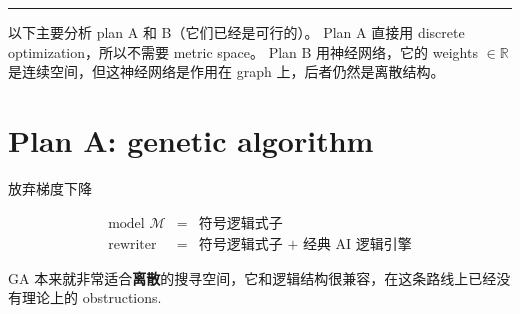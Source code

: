 \documentclass[12pt, orivec]{article}
\newcommand{\cc}[2]{#1}
\newcommand{\cc}[2]{#2}
\begin{document}


\begin{center}
\rule{0.4\textwidth}{.6pt}
\end{center}

\cc{以下主要分析 plan A 和 B（它们已经是可行的）。 Plan A 直接用 discrete optimization，所以不需要 metric space。  Plan B 用神经网络，它的 weights $\in \mathbb{R}$ 是连续空间，但这神经网络是作用在 graph 上，后者仍然是离散结构。
}{
The following main analysis of plan A and B (they are already feasible). Plan A uses discrete optimization directly, so no metric space is required. Plan B uses a neural network whose weights $\in \mathbb{R}$ is a contiguous space, but this neural network acts on the graph, which is still a discrete structure.}

\section{Plan A: genetic algorithm}
\label{COCO}

\begin{tcolorbox}[ams equation, colback=yellow, colframe=white]
\cc{
\mbox{放弃梯度下降}}{
\mbox{\textbf{abandon} gradient descent}
}
\end{tcolorbox}
\begin{eqnarray}
\cc{
\mbox{model } \mathscr{M} &=& \mbox{符号逻辑式子} \nonumber \\
}{
\mbox{model } \mathscr{M} &=& \mbox{symbolic logic formula} \nonumber \\
}
\cc{
\mbox{rewriter} &=& \mbox{符号逻辑式子 + 经典 AI 逻辑引擎}}{
\mbox{rewriter} &=& \mbox{symbolic logic formula + classical AI logic engine}
}
\end{eqnarray}

\cc{GA 本来就非常适合\textbf{离散}的搜寻空间，它和逻辑结构很兼容，在这条路线上已经没有理论上的 obstructions. 
}{
GA is very suitable for the \textbf{discrete} search space. It is compatible with the logical structure. There is no theoretical obstructions on this route.}
\end{document}
